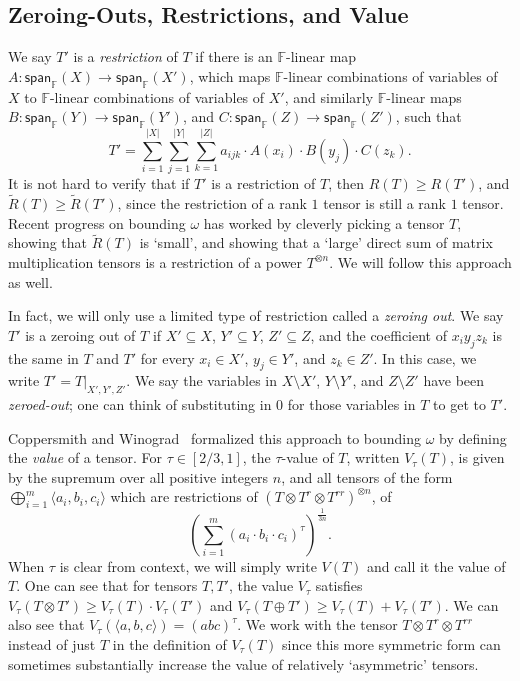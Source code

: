 \PassOptionsToPackage{shortlabels}{enumitem}\documentclass[10pt,a4paper]{article}
\newcommand{\F}{\mathbb{F}}
\begin{document}
\subsection{Zeroing-Outs, Restrictions, and Value}

We say $T'$ is a \emph{restriction} of $T$ if there is an $\F$-linear map $A : \textsf{span}_\F(X) \to \textsf{span}_\F(X')$, which maps $\F$-linear combinations of variables of $X$ to $\F$-linear combinations of variables of $X'$, and similarly $\F$-linear maps $B : \textsf{span}_\F(Y) \to \textsf{span}_\F(Y')$, and $C : \textsf{span}_\F(Z) \to \textsf{span}_\F(Z')$, such that  $$T' = \sum_{i=1}^{|X|} \sum_{j=1}^{|Y|} \sum_{k=1}^{|Z|} a_{ijk} \cdot A(x_i) \cdot B(y_j) \cdot C(z_k).$$
It is not hard to verify that if $T'$ is a restriction of $T$, then $R(T) \geq R(T')$, and $\tilde{R}(T) \geq \tilde{R}(T')$, since the restriction of a rank $1$ tensor is still a rank $1$ tensor. Recent progress on bounding $\omega$ has worked by cleverly picking a tensor $T$, showing that $\tilde{R}(T)$ is `small', and showing that a `large' direct sum of matrix multiplication tensors is a restriction of a power $T^{\otimes n}$. We will follow this approach as well.

In fact, we will only use a limited type of restriction called a \emph{zeroing out}. We say $T'$ is a zeroing out of $T$ if $X' \subseteq X$, $Y' \subseteq Y$, $Z' \subseteq Z$, and the coefficient of $x_i y_j z_k$ is the same in $T$ and $T'$ for every $x_i \in X'$, $y_j \in Y'$, and $z_k \in Z'$. In this case, we write $T' = T|_{X',Y',Z'}$. We say the variables in $X \setminus X'$, $Y \setminus Y'$, and $Z \setminus Z'$ have been \emph{zeroed-out}; one can think of substituting in $0$ for those variables in $T$ to get to $T'$.

Coppersmith and Winograd~\cite{coppersmith} formalized this approach to bounding $\omega$ by defining the \emph{value} of a tensor. For $\tau \in [2/3,1]$, the $\tau$-value of $T$, written $V_\tau(T)$, is given by the supremum over all positive integers $n$, and all tensors of the form $\bigoplus_{i=1}^m \langle a_i,b_i,c_i \rangle$ which are restrictions of $(T \otimes T^r \otimes T^{rr})^{\otimes n}$, of $$\left( \sum_{i=1}^m (a_i \cdot b_i \cdot c_i)^\tau \right)^{\frac{1}{3n}}.$$ When $\tau$ is clear from context, we will simply write $V(T)$ and call it the value of $T$. One can see that for tensors $T,T'$, the value $V_\tau$ satisfies $V_\tau(T\otimes T')\geq V_\tau(T) \cdot V_\tau(T')$ and $V_\tau(T\oplus T')\geq V_\tau(T)+V_\tau(T')$. We can also see that $V_\tau(\langle a,b,c \rangle) = (abc)^\tau$. We work with the tensor $T \otimes T^r \otimes T^{rr}$ instead of just $T$ in the definition of $V_\tau(T)$ since this more symmetric form can sometimes substantially increase the value of relatively `asymmetric' tensors.
\end{document}
